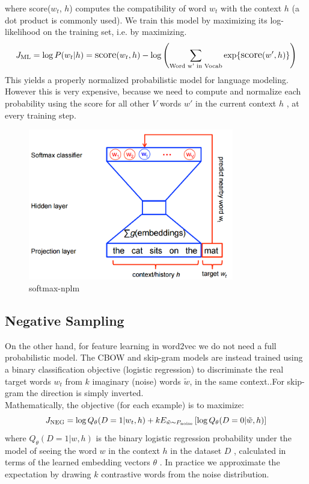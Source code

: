 where \text score({$w_t$}, $h$) computes the compatibility of word ${w_t}$ with the context ${h}$ (a dot product is commonly used). We train this model by maximizing its log-likelihood on the training set, i.e. by maximizing. 
 \begin{equation}
        \large 
           J_\text{ML} = \log P(w_t | h)
                       = \text{score} (w_t, h) -
                       \log \left( \sum_\text{Word w' in Vocab} \exp\{ \text{score} (w', h) \} \right)
 \end{equation}
 This yields a properly normalized probabilistic model for language modeling. However this is very expensive, because we need to compute and normalize each probability using the score for all other $V$  words $w'$ in the current context $h$ , at every training step.
\begin{figure}[H]%
    \center%
    \includegraphics[width=0.8\textwidth]{images/softmax-nplm.png}%
    \caption[softmax]{softmax-nplm}\label{fig:softmax}%
  \end{figure}
  

\subsection{Negative Sampling}
On the other hand, for feature learning in word2vec we do not need a full probabilistic model. The CBOW and skip-gram models are instead trained using a binary classification objective (logistic regression) to discriminate the real target words $w_t$ from $k$ imaginary (noise) words $\tilde w$, in the same context..For skip-gram the direction is simply inverted.\\ Mathematically, the objective (for each example) is to maximize:
  \begin{equation}
     \large
        J_\text{NEG} = \log Q_\theta(D=1 |w_t, h) +
        k {\space{E}}_{\tilde w \sim P_\text{noise}}
        \left[ \log Q_\theta(D = 0 |\tilde w, h) \right]
  \end{equation}
  where $Q_\theta(D=1 | w, h)$  is the binary logistic regression probability under the model of seeing the word $w$ in the context $h$ in the dataset $D$ , calculated in terms of the learned embedding vectors $\theta$ . In practice we approximate the expectation by drawing $k$  contrastive words from the noise distribution.

